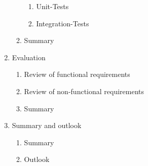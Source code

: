 \begin{enumerate}
\begin{enumerate}
\begin{enumerate}
			\item Unit-Tests
			\item Integration-Tests
		\end{enumerate}
		\item Summary
	\end{enumerate}
	\item Evaluation
	\begin{enumerate}
		\item Review of functional requirements
		\item Review of non-functional requirements
		\item Summary
	\end{enumerate}
	\item Summary and outlook
	\begin{enumerate}
		\item Summary
		\item Outlook
	\end{enumerate}
\end{enumerate}